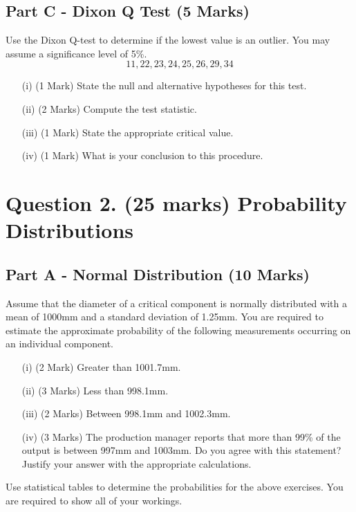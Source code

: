 \documentclass[a4paper,12pt]{article}
\begin{document}
\subsection*{Part C - Dixon Q Test (5 Marks)}

	
	Use the Dixon Q-test to determine if the lowest value is an outlier. You may assume a significance level of 5\%.
		\[ 11,22,23,24,25,26,29,34\]
	\begin{itemize}
		\item[(i)](1 Mark)	State the null and alternative hypotheses for this test.
		\item[(ii)](2 Marks) Compute the test statistic.
		\item[(iii)](1 Mark) State the appropriate critical value.
		\item[(iv)](1 Mark) What is your conclusion to this procedure.
	\end{itemize}



\section*{Question 2. (25 marks) Probability Distributions }




\subsection*{Part A - Normal Distribution (10 Marks)}

\smallskip	
\noindent Assume that the diameter of a critical component is normally distributed with a mean of 1000mm and a standard deviation of 1.25mm. You are required  to estimate the approximate probability of the following measurements occurring on an individual component.
\begin{itemize}
	\item[(i)](2 Mark) Greater than 1001.7mm.
	\item[(ii)](3 Marks) Less than 998.1mm.
	\item [(iii)](2 Marks) Between 998.1mm and 1002.3mm.
	\item[(iv)] (3 Marks) The production manager reports that more than 99\% of the output is between 997mm and 1003mm. Do you agree with this statement? Justify your answer with the appropriate calculations.
\end{itemize}
\medskip
\noindent Use statistical tables to determine the probabilities for the above exercises. You are required to show all of your workings.
\end{document}

